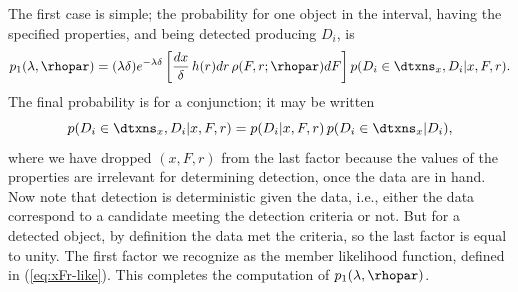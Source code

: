 The first case is simple; the probability for one object in the interval, having the specified properties, and being detected producing $D_i$, is
\begin{equation}\label{eq:dtxn1}
p_1(\lambda,\rhopar) = 
  (\lambda \delta) e^{-\lambda \delta} 
  \left[\frac{dx}{\delta}\, h(r)dr\, \rho(F,r;\rhopar)dF\right]
  p(D_i\in\dtxns_x, D_i|x,F,r).
\end{equation}
The final probability is for a conjunction; it may be written
\begin{equation}\label{eq:dtxn-joint}
p(D_i\in\dtxns_x, D_i|x,F,r) = p(D_i|x,F,r)\, p(D_i\in\dtxns_x | D_i),
\end{equation}
where we have dropped $(x,F,r)$ from the last factor because the values of the properties are irrelevant for determining detection, once the data are in hand.
Now note that detection is deterministic given the data, i.e., either the data correspond to a candidate meeting the detection criteria or not.
But for a detected object, by definition the data met the criteria, so the last factor is equal to unity.
The first factor we recognize as the member likelihood function, defined in (\ref{eq:xFr-like}).
This completes the computation of $p_1(\lambda,\rhopar)$.


